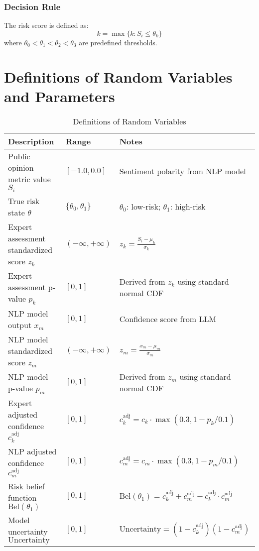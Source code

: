 \documentclass[11pt,a4paper]{report}
\begin{document}
\subsubsection{Decision Rule}
The risk score is defined as:
\begin{equation}
k = \max\{k: S_i \leq \theta_k\}
\end{equation}
where $\theta_0 < \theta_1 < \theta_2 < \theta_3$ are predefined thresholds.

\clearpage
\section{Definitions of Random Variables and Parameters}

\begin{table}[htbp]
\centering
\caption{Definitions of Random Variables}
\label{tab:random_variables}
\begin{tabularx}{\textwidth}{X l X}
\toprule
\textbf{Description} & \textbf{Range} & \textbf{Notes} \\
\midrule
Public opinion metric value $S_i$ & $[-1.0, 0.0]$ & Sentiment polarity from NLP model \\
True risk state $\theta$ & $\{\theta_0, \theta_1\}$ & $\theta_0$: low-risk; $\theta_1$: high-risk \\
Expert assessment standardized score $z_k$ & $(-\infty, +\infty)$ & $z_k = \frac{S_i - \mu_k}{\sigma_k}$ \\
Expert assessment p-value $p_k$ & $[0, 1]$ & Derived from $z_k$ using standard normal CDF \\
NLP model output $x_m$ & $[0, 1]$ & Confidence score from LLM \\
NLP model standardized score $z_m$ & $(-\infty, +\infty)$ & $z_m = \frac{x_m - \mu_m}{\sigma_m}$ \\
NLP model p-value $p_m$ & $[0, 1]$ & Derived from $z_m$ using standard normal CDF \\
Expert adjusted confidence $c^{\text{adj}}_k$ & $[0, 1]$ & $c_k^{\text{adj}} = c_k \cdot \max(0.3, 1 - p_k/0.1)$ \\
NLP adjusted confidence $c^{\text{adj}}_m$ & $[0, 1]$ & $c_m^{\text{adj}} = c_m \cdot \max(0.3, 1 - p_m/0.1)$ \\
Risk belief function $\text{Bel}(\theta_1)$ & $[0, 1]$ & $\text{Bel}(\theta_1) = c_k^{\text{adj}} + c_m^{\text{adj}} - c_k^{\text{adj}} \cdot c_m^{\text{adj}}$ \\
Model uncertainty $\text{Uncertainty}$ & $[0, 1]$ & $\text{Uncertainty} = (1 - c_k^{\text{adj}})(1 - c_m^{\text{adj}})$ \\
\bottomrule
\end{tabularx}
\end{table}
\end{document}
